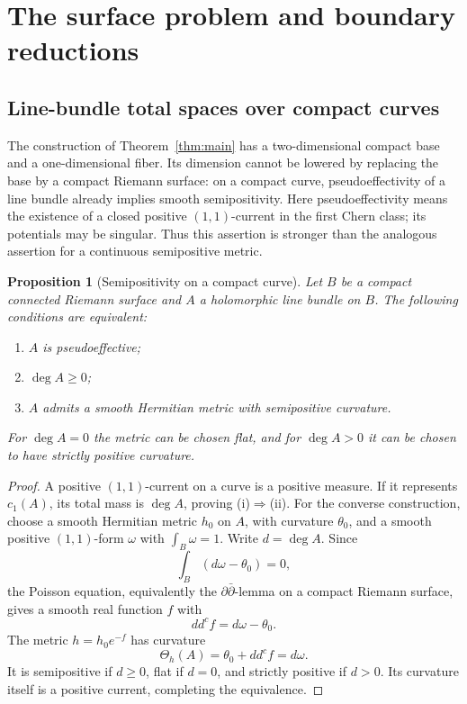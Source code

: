 \documentclass[11pt]{amsart}
\newtheorem{proposition}[theorem]{Proposition}
\theoremstyle{definition}
\theoremstyle{remark}
\numberwithin{equation}{section}
\newcommand{\ddc}{dd^c}
\begin{document}
\section{The surface problem and boundary reductions}\label{sec:surfaces}

\subsection{Line-bundle total spaces over compact curves}
\label{sec:surface-curves}

The construction of Theorem~\ref{thm:main} has a two-dimensional compact
base and a one-dimensional fiber.  Its dimension cannot be lowered by
replacing the base by a compact Riemann surface: on a compact curve,
pseudoeffectivity of a line bundle already implies smooth semipositivity.
Here pseudoeffectivity means the existence of a closed positive
$(1,1)$-current in the first Chern class; its potentials may be singular.
Thus this assertion is stronger than the analogous assertion for a
continuous semipositive metric.

\begin{proposition}[Semipositivity on a compact curve]
\label{prop:curve-semipositivity}
Let $B$ be a compact connected Riemann surface and $A$ a holomorphic
line bundle on $B$.  The following conditions are equivalent:
\begin{enumerate}[label=\textup{(\roman*)},leftmargin=2.5em]
\item $A$ is pseudoeffective;
\item $\deg A\ge0$;
\item $A$ admits a smooth Hermitian metric with semipositive curvature.
\end{enumerate}
For $\deg A=0$ the metric can be chosen flat, and for $\deg A>0$ it can
be chosen to have strictly positive curvature.
\end{proposition}

\begin{proof}
A positive $(1,1)$-current on a curve is a positive measure.  If it
represents $c_1(A)$, its total mass is $\deg A$, proving
\textup{(i)}$\Rightarrow$\textup{(ii)}.  For the converse construction,
choose a smooth Hermitian metric $h_0$ on $A$, with curvature $\theta_0$,
and a smooth positive $(1,1)$-form $\omega$ with $\int_B\omega=1$.
Write $d=\deg A$.  Since
\[
\int_B(d\omega-\theta_0)=0,
\]
the Poisson equation, equivalently the $\partial\bar\partial$-lemma
on a compact Riemann surface, gives a smooth real function $f$ with
\[
\ddc f=d\omega-\theta_0.
\]
The metric $h=h_0e^{-f}$ has curvature
\[
\Theta_h(A)=\theta_0+\ddc f=d\omega.
\]
It is semipositive if $d\ge0$, flat if $d=0$, and strictly positive
if $d>0$.  Its curvature itself is a positive current, completing the
equivalence.
\end{proof}
\end{document}

